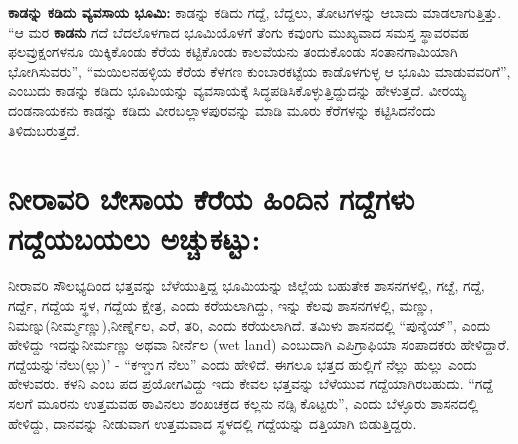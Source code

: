 \textbf{ಕಾಡನ್ನು ಕಡಿದು ವ್ಯವಸಾಯ ಭೂಮಿ:} ಕಾಡನ್ನು ಕಡಿದು ಗದ್ದೆ, ಬೆದ್ದಲು, ತೋಟಗಳನ್ನು ಆಬಾದು ಮಾಡಲಾಗುತ್ತಿತ್ತು. “ಆ ಮರ \textbf{ಕಾಡನು} ಗದೆ ಬೆದಲೊಳಗಾದ ಭೂಮಿಯೊಳಗೆ ತೆಂಗು ಕವುಂಗು ಮುಖ್ಯವಾದ ಸಮಸ್ತ ಸ್ಥಾವರವಹ ಫಲವ್ರುಕ್ಷಂ\break ಗಳನೂ ಯಿಕ್ಕಿಕೊಂಡು ಕೆರೆಯ ಕಟ್ಟಿಕೊಂಡು ಕಾಲವೆಯನು ತಂದುಕೊಂಡು ಸಂತಾನಗಾಮಿಯಾಗಿ ಭೋಗಿಸುವರು”, “ಮಯಿಲನಹಳ್ಳಿಯ ಕೆರೆಯ ಕೆಳಗಣ ಕುಂಬಾರಕಟ್ಟೆಯ ಕಾಡೊಳಗುಳ್ಳ ಆ ಭೂಮಿ ಮಾಡುವವರಿಗೆ”, ಎಂಬುದು ಕಾಡನ್ನು ಕಡಿದು ಭೂಮಿಯನ್ನು ವ್ಯವಸಾಯಕ್ಕೆ ಸಿದ್ಧಪಡಿಸಿಕೊಳ್ಳುತ್ತಿದ್ದುದನ್ನು ಹೇಳುತ್ತದೆ. ವೀರಯ್ಯ ದಂಡನಾಯಕನು ಕಾಡನ್ನು ಕಡಿದು ವೀರಬಲ್ಲಾಳಪುರವನ್ನು ಮಾಡಿ ಮೂರು ಕೆರೆಗಳನ್ನು ಕಟ್ಟಿಸಿದನೆಂದು ತಿಳಿದುಬರುತ್ತದೆ.

\section*{ನೀರಾವರಿ ಬೇಸಾಯ \enginline{-} ಕೆರೆಯ ಹಿಂದಿನ ಗದ್ದೆಗಳು \enginline{-} ಗದ್ದೆಯಬಯಲು \enginline{-} ಅಚ್ಚುಕಟ್ಟು:}

ನೀರಾವರಿ ಸೌಲಭ್ಯದಿಂದ ಭತ್ತವನ್ನು ಬೆಳೆಯುತ್ತಿದ್ದ ಭೂಮಿಯನ್ನು ಜಿಲ್ಲೆಯ ಬಹುತೇಕ ಶಾಸನಗಳಲ್ಲಿ, ಗೞ್ದೆ, ಗದ್ದೆ, ಗರ್ದ್ದೆ, ಗದ್ದೆಯ ಸ್ಥಳ, ಗದ್ದೆಯ ಕ್ಷೇತ್ರ, ಎಂದು ಕರೆಯಲಾಗಿದ್ದು, ಇನ್ನು ಕೆಲವು ಶಾಸನಗಳಲ್ಲಿ, ಮಣ್ಣು, ನಿಮಣ್ನು(ನೀರ್ಮ್ಮಣ್ಣು),\break ನೀರ್ಣ್ನೆಲ, ಎರೆ, ತರಿ, ಎಂದು ಕರೆಯಲಾಗಿದೆ. ತಮಿಳು ಶಾಸನದಲ್ಲಿ “ಪುನ್ಶೆಯ್​”, ಎಂದು ಹೇಳಿದ್ದು ಇದನ್ನು\break ನೀರ್ಮಣ್ಣು ಅಥವಾ ನೀರ್ನೆಲ (wet land) ಎಂಬುದಾಗಿ ಎಪಿಗ್ರಾಫಿಯಾ ಸಂಪಾದಕರು ಹೇಳಿದ್ದಾರೆ. ಗದ್ದೆಯನ್ನು\break ‘ನೆಲು(ಲ್ಲು)’ - “ಕಞ್ಡುಗ ನೆಲು” ಎಂದು ಹೇಳಿದೆ. ಈಗಲೂ ಭತ್ತದ ಹುಲ್ಲಿಗೆ ನೆಲ್ಲು ಹುಲ್ಲು ಎಂದು ಹೇಳುವರು. ಕಳನಿ ಎಂಬ ಪದ ಪ್ರಯೋಗವಿದ್ದು ಇದು ಕೇವಲ ಭತ್ತವನ್ನು ಬೆಳೆಯುವ ಗದ್ದೆಯಾಗಿರಬಹುದು. “ಗದ್ದೆ ಸಲಗೆ ಮೂರನು ಉತ್ತಮವಹ ಠಾವಿನಲು ಶಂಖಚಕ್ರದ ಕಲ್ಲನು ನಡ್ಸಿ ಕೊಟ್ಟರು”, ಎಂದು ಬೆಳ್ಳೂರು ಶಾಸನದಲ್ಲಿ ಹೇಳಿದ್ದು, ದಾನವನ್ನು ನೀಡುವಾಗ ಉತ್ತಮವಾದ ಸ್ಥಳದಲ್ಲಿ ಗದ್ದೆಯನ್ನು ದತ್ತಿಯಾಗಿ ಬಿಡುತ್ತಿದ್ದರು.

\vskip 2pt

